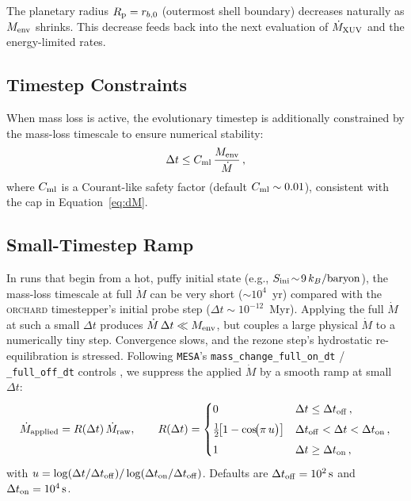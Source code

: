 \documentclass{aastex701}
\newcommand{\Mdot}{\dot{M}}
\newcommand{\Menv}{M_{\rm env}}
\newcommand{\Rp}{R_{\rm p}}
\newcommand{\orchard}{\textsc{orchard}}
\begin{document}
The planetary radius $\Rp = r_{b,0}$ (outermost shell boundary)
decreases naturally as $\Menv$ shrinks.  This decrease feeds back into
the next evaluation of $\Mdot_{\rm XUV}$ and the energy-limited rates.

\subsection{Timestep Constraints}\label{subsec:timestep}

When mass loss is active, the evolutionary timestep is additionally
constrained by the mass-loss timescale to ensure numerical stability:
\begin{equation}
  \Delta t \le C_{\rm ml}\,\frac{\Menv}{\Mdot}\,,
\end{equation}
where $C_{\rm ml}$ is a Courant-like safety factor (default $C_{\rm ml}
\sim 0.01$), consistent with the cap in Equation~\eqref{eq:dM}.

\subsection{Small-Timestep Ramp}\label{subsec:ramp}

In runs that begin from a hot, puffy initial state (e.g., $S_{\rm
ini}\!\sim\!9\,k_{B}/{\rm baryon}$), the mass-loss timescale at full
$\Mdot$ can be very short ($\sim 10^{4}$~yr) compared with the
\orchard{} timestepper's initial probe step ($\Delta t \sim
10^{-12}$~Myr).  Applying the full $\Mdot$ at such a small $\Delta t$
produces $\Mdot\,\Delta t \ll \Menv$, but couples a large physical
$\Mdot$ to a numerically tiny step.  Convergence slows, and the rezone
step's hydrostatic re-equilibration is stressed.  Following
\texttt{MESA}'s \texttt{mass\_change\_full\_on\_dt} /
\texttt{\_full\_off\_dt} controls \citep{Paxton2011}, we suppress the
applied $\Mdot$ by a smooth ramp at small $\Delta t$:
\begin{equation}\label{eq:ramp}
  \Mdot_{\rm applied}
    = R(\Delta t)\,\Mdot_{\rm raw},
  \qquad
  R(\Delta t) =
    \begin{cases}
      0
      & \Delta t \le \Delta t_{\rm off}\,,\\[4pt]
      \tfrac{1}{2}\!\bigl[1 - \cos\!\bigl(\pi\,u\bigr)\bigr]
      & \Delta t_{\rm off} < \Delta t < \Delta t_{\rm on}\,,\\[4pt]
      1
      & \Delta t \ge \Delta t_{\rm on}\,,
    \end{cases}
\end{equation}
with
$u = \log(\Delta t / \Delta t_{\rm off}) / \log(\Delta t_{\rm on} /
\Delta t_{\rm off})$.  Defaults are
$\Delta t_{\rm off} = 10^{2}\,{\rm s}$ and
$\Delta t_{\rm on} = 10^{4}\,{\rm s}$.
\end{document}
